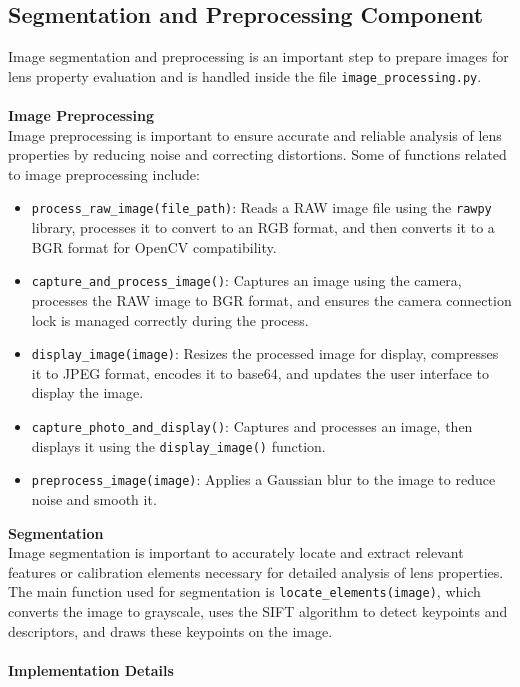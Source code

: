 \subsection{Segmentation and Preprocessing Component}

Image segmentation and preprocessing is an important step to prepare images for lens property evaluation and is handled inside the file \texttt{image\_processing.py}. 
\\
\\
\textbf{Image Preprocessing}
\\
Image preprocessing is important to ensure accurate and reliable analysis of lens properties by reducing noise and correcting distortions. Some of functions related to image preprocessing include:

\begin{itemize}
    \item \texttt{process\_raw\_image(file\_path)}: Reads a RAW image file using the \texttt{rawpy} library, processes it to convert to an RGB format, and then converts it to a BGR format for OpenCV compatibility.
    \item \texttt{capture\_and\_process\_image()}: Captures an image using the camera, processes the RAW image to BGR format, and ensures the camera connection lock is managed correctly during the process.
    \item \texttt{display\_image(image)}: Resizes the processed image for display, compresses it to JPEG format, encodes it to base64, and updates the user interface to display the image.
    \item \texttt{capture\_photo\_and\_display()}: Captures and processes an image, then displays it using the \texttt{display\_image()} function.
    \item \texttt{preprocess\_image(image)}: Applies a Gaussian blur to the image to reduce noise and smooth it.
\end{itemize}
\textbf{Segmentation}
\\
Image segmentation is important to accurately locate and extract relevant features or calibration elements necessary for detailed analysis of lens properties. The main function used for segmentation is \texttt{locate\_elements(image)}, which converts the image to grayscale, uses the SIFT algorithm to detect keypoints and descriptors, and draws these keypoints on the image.
\\
\\
\textbf{Implementation Details}
\\
